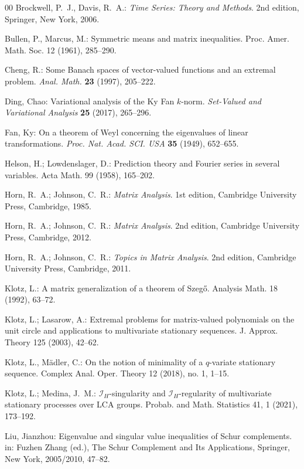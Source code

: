 \documentclass{amsart}
\begin{document}
{\begin{thebibliography}{00}
 Brockwell, P.~J., Davis, R.~A.: 
 {\it Time Series: Theory and Methods}.
 2nd edition, Springer, New York, 2006.
 
 Bullen, P., Marcus, M.: 
 Symmetric means and matrix inequalities.
 Proc. Amer. Math. Soc. 12 (1961), 285--290. 
 
 Cheng, R.:
 Some Banach spaces of vector-valued functions and an extremal problem.
 {\it Anal. Math.} {\bf 23} (1997), 205--222.
 
 Ding, Chao:
 Variational analysis of the Ky Fan $k$-norm.
 {\it Set-Valued and Variational Analysis} {\bf 25} (2017), 265--296.
 
 Fan, Ky:
 On a theorem of Weyl concerning the eigenvalues of linear transformations.
 {\it Proc. Nat. Acad. SCI. USA} {\bf 35} (1949), 652--655.

 Helson, H.; Lowdenslager, D.:
 Prediction theory and Fourier series in several variables.
 Acta Math. 99 (1958), 165--202.

 Horn, R.~A.; Johnson, C.~R.:
 {\it Matrix Analysis}.
 1st edition, Cambridge University Press, Cambridge, 1985.
 
 Horn, R.~A.; Johnson, C.~R.:
 {\it Matrix Analysis}.
 2nd edition, Cambridge University Press, Cambridge, 2012.
 
 Horn, R.~A.; Johnson, C.~R.:
 {\it Topics in Matrix Analysis}.
 2nd edition, Cambridge University Press, Cambridge, 2011.
 
 Klotz, L.:
 A matrix generalization of a theorem of Szeg{\H{o}}.
 Analysis Math. 18 (1992), 63--72.

 Klotz, L.; Lasarow, A.:
 Extremal problems for matrix-valued polynomials on the unit circle and applications
 to multivariate stationary sequences.
 J. Approx. Theory 125 (2003), 42--62.
 
 Klotz, L., M\"adler, C.: 
 On the notion of minimality of a $q$-variate stationary sequence.
 Complex Anal. Oper. Theory 12 (2018), no. 1, 1--15. 

 Klotz, L.; Medina, J.~M.:
 ${\mathcal I}_H$-singularity and ${\mathcal I}_H$-regularity of multivariate stationary processes over LCA groups.
 Probab. and Math. Statistics 41, 1 (2021), 173--192.
 
 Liu, Jianzhou:
 Eigenvalue and singular value inequalities of Schur complements.
 in: Fuzhen Zhang (ed.), The Schur Complement and Its Applications, Springer, New York, 2005/2010, 47--82.


\end{thebibliography}}
\end{document}
